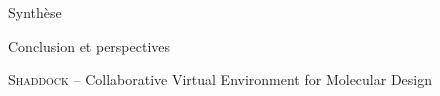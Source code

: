 \documentclass[myfrancais]{mythesis}
\begin{document}
	\begin{mypart}{Synthèse}
		\begin{mychapter}{Conclusion et perspectives}
		\end{mychapter}
	\end{mypart}

	\myglossary
	\myappendix
	\begin{mychapter}{\textsc{Shaddock} -- Collaborative Virtual Environment for Molecular Design}
	\end{mychapter}
\end{document}
